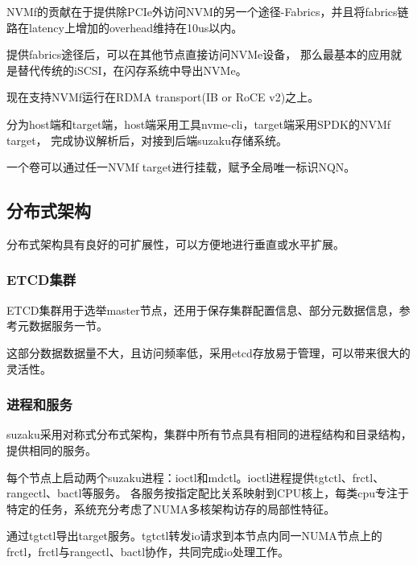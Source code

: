 

NVMf的贡献在于提供除PCIe外访问NVM的另一个途径-Fabrics，并且将fabrics链路在latency上增加的overhead维持在10us以内。

提供fabrics途径后，可以在其他节点直接访问NVMe设备，
那么最基本的应用就是替代传统的iSCSI，在闪存系统中导出NVMe。

现在支持NVMf运行在RDMA transport(IB or RoCE v2)之上。

分为host端和target端，host端采用工具nvme-cli，target端采用SPDK的NVMf target，
完成协议解析后，对接到后端suzaku存储系统。

一个卷可以通过任一NVMf target进行挂载，赋予全局唯一标识NQN。


\subsection{分布式架构}



分布式架构具有良好的可扩展性，可以方便地进行垂直或水平扩展。

\subsubsection{ETCD集群}

ETCD集群用于选举master节点，还用于保存集群配置信息、部分元数据信息，参考元数据服务一节。

这部分数据数据量不大，且访问频率低，采用etcd存放易于管理，可以带来很大的灵活性。

\subsubsection{进程和服务}

suzaku采用对称式分布式架构，集群中所有节点具有相同的进程结构和目录结构，提供相同的服务。

每个节点上启动两个suzaku进程：ioctl和mdctl。ioctl进程提供tgtctl、frctl、rangectl、bactl等服务。
各服务按指定配比关系映射到CPU核上，每类cpu专注于特定的任务，系统充分考虑了NUMA多核架构访存的局部性特征。

通过tgtctl导出target服务。tgtctl转发io请求到本节点内同一NUMA节点上的frctl，frctl与rangectl、bactl协作，共同完成io处理工作。

